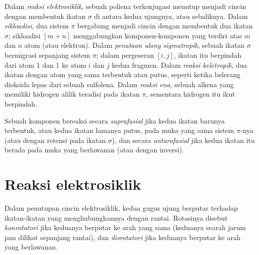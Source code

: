 \begin{definition}\label{def:b3:pericyclic:families}
Dalam \emph{reaksi elektrosiklik}, sebuah poliena
terkonjugasi menutup menjadi cincin dengan membentuk ikatan $\sigma$ di antara kedua ujungnya, atau
sebaliknya. Dalam \emph{sikloadisi}, dua sistem $\pi$ bergabung
menjadi cincin dengan membentuk dua ikatan $\sigma$; sikloadisi $[m + n]$ menggabungkan komponen-komponen
yang terdiri atas $m$ dan $n$ atom (atau elektron). Dalam \emph{penataan ulang
sigmatropik}, sebuah ikatan $\sigma$ bermigrasi sepanjang sistem $\pi$;
dalam pergeseran $[i, j]$, ikatan itu berpindah dari atom 1 dan 1 ke atom $i$ dan $j$
kedua fragmen. Dalam \emph{reaksi keletropik},
dua ikatan dengan atom yang sama terbentuk atau putus, seperti ketika belerang dioksida
lepas dari sebuah sulfolena. Dalam \emph{reaksi ena}, sebuah alkena
yang memiliki hidrogen alilik teradisi pada ikatan $\pi$, sementara hidrogen itu ikut berpindah.
\end{definition}

\begin{definition}\label{def:b3:pericyclic:faciality}
Sebuah komponen bereaksi secara \emph{suprafasial} jika kedua ikatan barunya
terbentuk, atau kedua ikatan lamanya putus, pada muka yang sama sistem $\pi$-nya (atau dengan
retensi pada ikatan $\sigma$), dan secara \emph{antarafasial} jika kedua ikatan itu
berada pada muka yang berlawanan (atau dengan inversi).
\end{definition}

\section{Reaksi elektrosiklik}

\begin{definition}\label{def:b3:pericyclic:rotation-modes}
Dalam penutupan cincin elektrosiklik, kedua gugus ujung berputar terhadap ikatan-ikatan
yang menghubungkannya dengan rantai. Rotasinya disebut \emph{konrotatori}
jika keduanya berputar ke arah yang sama (keduanya searah jarum jam dilihat sepanjang rantai), dan
\emph{disrotatori} jika keduanya berputar ke arah yang berlawanan.
\end{definition}

